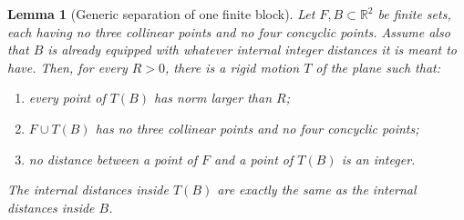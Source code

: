 \documentclass[11pt,a4paper]{amsart}
\newtheorem{lemma}[theorem]{Lemma}
\theoremstyle{definition}
\newcommand{\R}{\mathbb{R}}
\begin{document}
\begin{lemma}[Generic separation of one finite block]\label{lem:generic-placement}
Let $F,B\subset\R^2$ be finite sets, each having no three collinear points and no four concyclic points.  Assume also that $B$ is already equipped with whatever internal integer distances it is meant to have.  Then, for every $R>0$, there is a rigid motion $T$ of the plane such that:
\begin{enumerate}[label=(\roman*)]
    \item every point of $T(B)$ has norm larger than $R$;
    \item $F\cup T(B)$ has no three collinear points and no four concyclic points;
    \item no distance between a point of $F$ and a point of $T(B)$ is an integer.
\end{enumerate}
The internal distances inside $T(B)$ are exactly the same as the internal distances inside $B$.
\end{lemma}
\end{document}
